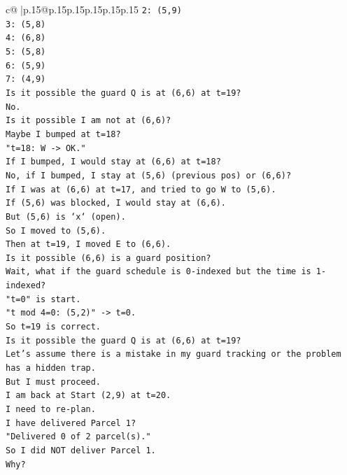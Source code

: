 \documentclass{article}
\begin{document}
{\begin{supertabular}{c@{$\;$}|p{.15\linewidth}@{}p{.15\linewidth}p{.15\linewidth}p{.15\linewidth}p{.15\linewidth}p{.15\linewidth}}
{{{\texttt{2: (5,9)} \\
\texttt{3: (5,8)} \\
\texttt{4: (6,8)} \\
\texttt{5: (5,8)} \\
\texttt{6: (5,9)} \\
\texttt{7: (4,9)} \\
\texttt{Is it possible the guard Q is at (6,6) at t=19?} \\
\texttt{No.} \\
\texttt{Is it possible I am not at (6,6)?} \\
\texttt{Maybe I bumped at t=18?} \\
\texttt{"t=18: W {-}> OK."} \\
\texttt{If I bumped, I would stay at (6,6) at t=18?} \\
\texttt{No, if I bumped, I stay at (5,6) (previous pos) or (6,6)?} \\
\texttt{If I was at (6,6) at t=17, and tried to go W to (5,6).} \\
\texttt{If (5,6) was blocked, I would stay at (6,6).} \\
\texttt{But (5,6) is `x` (open).} \\
\texttt{So I moved to (5,6).} \\
\texttt{Then at t=19, I moved E to (6,6).} \\
\texttt{Is it possible (6,6) is a guard position?} \\
\texttt{Wait, what if the guard schedule is 0{-}indexed but the time is 1{-}indexed?} \\
\texttt{"t=0" is start.} \\
\texttt{"t mod 4=0: (5,2)" {-}> t=0.} \\
\texttt{So t=19 is correct.} \\
\texttt{Is it possible the guard Q is at (6,6) at t=19?} \\
\texttt{Let's assume there is a mistake in my guard tracking or the problem has a hidden trap.} \\
\texttt{But I must proceed.} \\
\texttt{I am back at Start (2,9) at t=20.} \\
\texttt{I need to re{-}plan.} \\
\texttt{I have delivered Parcel 1?} \\
\texttt{"Delivered 0 of 2 parcel(s)."} \\
\texttt{So I did NOT deliver Parcel 1.} \\
\texttt{Why?} \\
}}}
\end{supertabular}}
\end{document}

